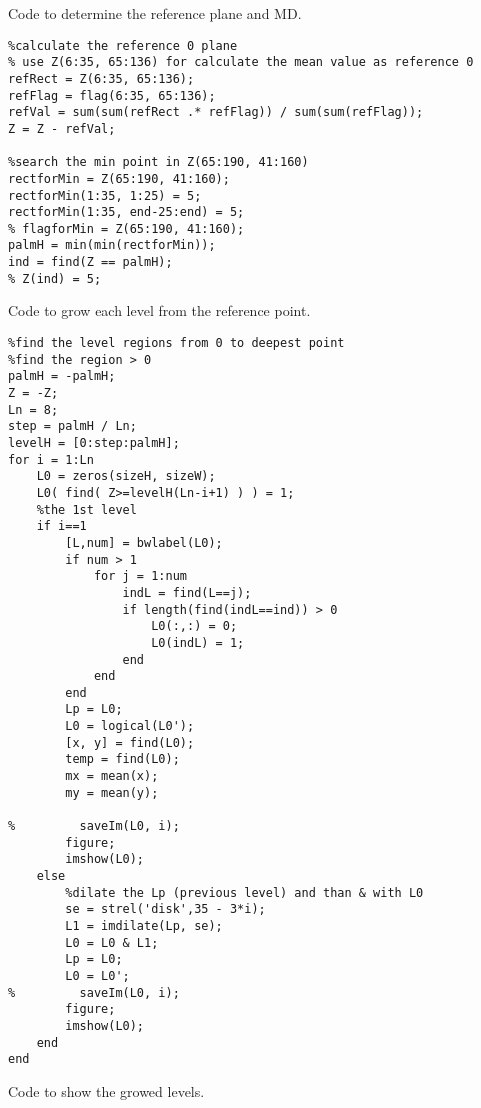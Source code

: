 Code to determine the reference plane and MD.

\begin{verbatim}
%calculate the reference 0 plane
% use Z(6:35, 65:136) for calculate the mean value as reference 0
refRect = Z(6:35, 65:136);
refFlag = flag(6:35, 65:136);
refVal = sum(sum(refRect .* refFlag)) / sum(sum(refFlag));
Z = Z - refVal;

%search the min point in Z(65:190, 41:160)
rectforMin = Z(65:190, 41:160);
rectforMin(1:35, 1:25) = 5;
rectforMin(1:35, end-25:end) = 5;
% flagforMin = Z(65:190, 41:160);
palmH = min(min(rectforMin));
ind = find(Z == palmH);
% Z(ind) = 5;
\end{verbatim}
\clearpage

Code to grow each level from the reference point.

\begin{verbatim}
%find the level regions from 0 to deepest point 
%find the region > 0
palmH = -palmH;
Z = -Z;
Ln = 8;
step = palmH / Ln;
levelH = [0:step:palmH];
for i = 1:Ln
    L0 = zeros(sizeH, sizeW);
    L0( find( Z>=levelH(Ln-i+1) ) ) = 1;
    %the 1st level
    if i==1
        [L,num] = bwlabel(L0);
        if num > 1
            for j = 1:num
                indL = find(L==j);
                if length(find(indL==ind)) > 0
                    L0(:,:) = 0;
                    L0(indL) = 1;
                end
            end
        end
        Lp = L0;
        L0 = logical(L0');  
        [x, y] = find(L0);
        temp = find(L0);
        mx = mean(x);
        my = mean(y);

%         saveIm(L0, i);
        figure;
        imshow(L0);
    else
        %dilate the Lp (previous level) and than & with L0
        se = strel('disk',35 - 3*i);  
        L1 = imdilate(Lp, se);
        L0 = L0 & L1;
        Lp = L0;
        L0 = L0';   
%         saveIm(L0, i);
        figure;
        imshow(L0);
    end    
end
\end{verbatim}
\clearpage


Code to show the growed levels.


